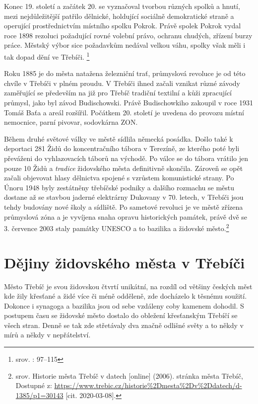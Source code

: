 \documentclass[a4paper,oneside,12p]{report}
\begin{document}
Konec 19. století a začátek 20. se vyznačoval tvorbou různých spolků a hnutí, mezi nejdůležitější patřilo dělnické, holdující sociálně demokratické straně a operující prostřednictvím místního spolku Pokrok.
Právě spolek Pokrok vydal roce 1898 rezoluci požadující rovné volební právo, ochranu chudých, zřízení burzy práce.
Městský výbor sice požadavkům nedával velkou váhu, spolky však měli i tak dopad dění ve Třebíči. \footnote{srov. \cite{Janak1981}: 97--115}

Roku 1885 je do města natažena železniční trať, průmyslová revoluce je od této chvíle v Třebíči v plném proudu.
V Třebíči ihned začali vznikat různé závody zaměřující se především na již pro Třebíč tradiční textilní a kůži zpracující průmysl, jako byl závod Budischowski.
Právě Budischowkiho zakoupil v roce 1931 Tomáš Baťa a areál rozšířil.
Počátkem 20. století je uvedena do provozu místní nemocnice, parní pivovar, sodovkárna ZON.

Během druhé světové války ve městě sídlila německá posádka.
Došlo také k deportaci 281 Židů do koncentračního tábora v Terezíně, ze kterého poté byli převáženi do vyhlazovacích táborů na východě.
Po válce se do tábora vrátilo jen pouze 10 Židů a \textit{tradice} židovského města definitivně skončila.
Zároveň se opět začali objevovat hlasy dělnictva spojené s vzrůstem komunistické strany.
Po Únoru 1948 byly zestátněny třebíčské podniky a dalšího rozmachu se městu dostane až se stavbou jaderné elektrárny Dukovany v 70. letech, v Třebíči jsou tehdy budovány nové školy a sídliště.
Po sametové revoluci je ve městě zřízena průmyslová zóna a je vyvíjena snaha opravu historických památek, právě dvě se 3. července 2003 staly památky UNESCO a to bazilika a židovské město.\footnote{srov. Historie města Třebíč v datech [online] (2006). stránka města Třebíč, Dostupné z: \url{https://www.trebic.cz/historie\%2Dmesta\%2Dv\%2Ddatech/d-1385/p1=30143} [cit. 2020-03-08]. }


\chapter{Dějiny židovského města v Třebíči}

Město Třebíč je svou židovskou čtvrtí unikátní, na rozdíl od většiny českých měst kde žily křesťané a židé více či méně odděleně, zde docházelo k těsnému soužití.
Dokonce i synagoga a bazilika jsou od sebe vzdáleny coby kamenem dohodil.
S postupem času se židovské město dostalo do obležení křesťanským Třebíčí se všech stran.
Denně se tak zde střetávaly dva značně odlišné světy a to někdy v mírů a někdy v nepřátelství.
\end{document}
